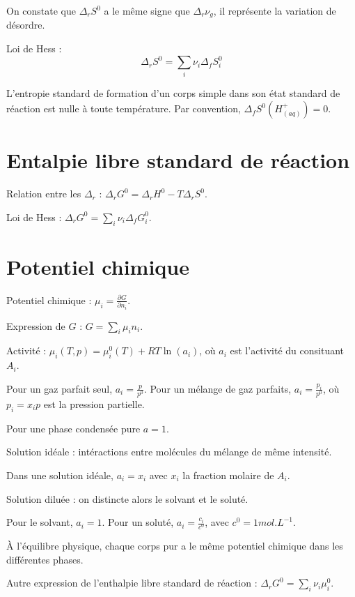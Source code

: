 \documentclass[12pt,a4paper] {article}
\begin{document}
On constate que $\Delta_r S^0$ a le même signe que $\Delta_r\nu_g$, il représente la variation de désordre.

Loi de Hess : \[\Delta_r S^0 = \sum_i \nu_i\Delta_f S^0_i\]

L'entropie standard de formation d'un corps simple dans son état standard de réaction est nulle à toute température. Par convention, $\Delta_f S^0(H^+_{(aq)}) = 0$.

\section{Entalpie libre standard de réaction}
Relation entre les $\Delta_r$ : $\Delta_r G^0 = \Delta_r H^0 - T\Delta_r S^0$.

Loi de Hess : $\Delta_r G^0 = \sum_i \nu_i\Delta_f G_i^0$.

\section{Potentiel chimique}
Potentiel chimique : $\mu_i = \frac{\partial G}{\partial n_i}$.

Expression de $G$ : $G = \sum_i \mu_i n_i$.

Activité : $\mu_i(T,p) = \mu_i^0(T) + RT\ln(a_i)$, où $a_i$ est l'activité du consituant $A_i$.

Pour un gaz parfait seul, $a_i = \frac{p}{p^0}$. Pour un mélange de gaz parfaits, $a_i = \frac{p_i}{p^0}$, où $p_i = x_ip$ est la pression partielle.

Pour une phase condensée pure $a = 1$.

Solution idéale : intéractions entre molécules du mélange de même intensité.

Dans une solution idéale, $a_i = x_i$ avec $x_i$ la fraction molaire de $A_i$.

Solution diluée : on distincte alors le solvant et le soluté.

Pour le solvant, $a_i = 1$. Pour un soluté, $a_i = \frac{c_i}{c^0}$, avec $c^0 = 1mol.L^{-1}$.

À l'équilibre physique, chaque corps pur a le même potentiel chimique dans les différentes phases.

Autre expression de l'enthalpie libre standard de réaction : $\Delta_r G^0 = \sum_i \nu_i \mu_i^0$.
\end{document}
